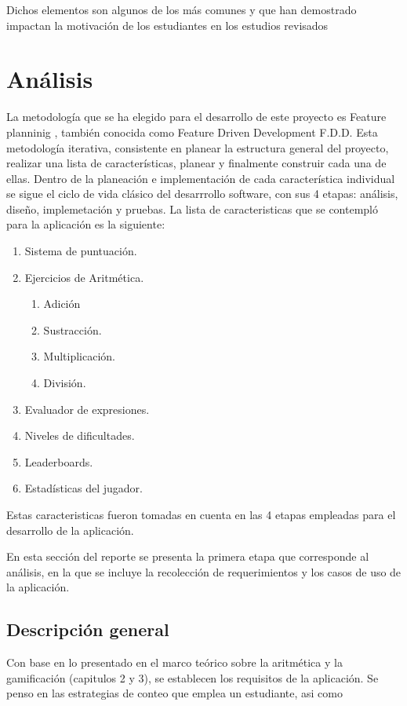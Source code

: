 \documentclass{article}
\begin{document}
Dichos elementos son algunos de los más comunes y que han demostrado impactan la motivación de los
estudiantes en los estudios revisados  \cite{wiggins2016overview,sanchez2017classcraft,ibanez2014gamification,tan2018}
\pagebreak



\section{Análisis}

La metodología que se ha elegido para el desarrollo de este proyecto es Feature planninig 
\cite{hunt2006feature}, también conocida como Feature Driven 
Development F.D.D. Esta metodología iterativa, consistente en planear
la estructura general del proyecto, realizar una lista de características, planear  y finalmente 
construir cada una de ellas. Dentro de la planeación e implementación de cada característica individual se sigue el ciclo de vida clásico del desarrrollo software, con sus 4 etapas: análisis, diseño, implemetación y pruebas. 
La lista de caracteristicas que se contempló para la aplicación es la siguiente:
\begin{enumerate}
	\item Sistema de puntuación.
	\item Ejercicios de Aritmética.
	\begin{enumerate}
		\item Adición 
		\item Sustracción.
		\item Multiplicación.
		\item División.
	\end{enumerate}
	\item Evaluador de expresiones.
	\item Niveles de dificultades.
	\item Leaderboards.
	\item Estadísticas del jugador.
\end{enumerate}

Estas caracteristicas fueron tomadas en cuenta en las 4 etapas empleadas para el desarrollo de la aplicación.
 
En esta sección del reporte se presenta la primera etapa que corresponde al análisis, en la que se incluye la recolección de requerimientos y los casos de uso de la aplicación.

\subsection{Descripción general}
Con base en lo presentado en el marco teórico sobre la aritmética y la gamificación (capitulos 2 y 3),
se establecen los requisitos de la aplicación. Se penso en las estrategias de conteo que emplea un 
estudiante, asi como 
\end{document}
